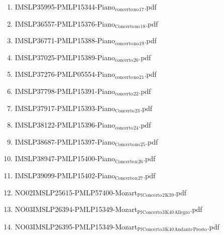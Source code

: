 \documentclass[11pt]{article}
\begin{document}
\begin{enumerate}
\begin{enumerate}
\item IMSLP35995-PMLP15344-Piano$_{\text{concerto}}$$_{\text{no}}$$_{\text{17}}$.pdf
\label{sec-1-1-1-1-44-49-4-17}

\item IMSLP36557-PMLP15376-Piano$_{\text{Concerto}}$$_{\text{no}}$$_{\text{18}}$.pdf
\label{sec-1-1-1-1-44-49-4-18}

\item IMSLP36771-PMLP15388-Piano$_{\text{concerto}}$$_{\text{no}}$$_{\text{19}}$.pdf
\label{sec-1-1-1-1-44-49-4-19}

\item IMSLP37025-PMLP15389-Piano$_{\text{concerto}}$$_{\text{20}}$.pdf
\label{sec-1-1-1-1-44-49-4-20}

\item IMSLP37276-PMLP05554-Piano$_{\text{concerto}}$$_{\text{no}}$$_{\text{21}}$.pdf
\label{sec-1-1-1-1-44-49-4-21}

\item IMSLP37798-PMLP15391-Piano$_{\text{concerto}}$$_{\text{22}}$.pdf
\label{sec-1-1-1-1-44-49-4-22}

\item IMSLP37917-PMLP15393-Piano$_{\text{Concerto}}$$_{\text{23}}$.pdf
\label{sec-1-1-1-1-44-49-4-23}

\item IMSLP38122-PMLP15396-Piano$_{\text{concerto}}$$_{\text{24}}$.pdf
\label{sec-1-1-1-1-44-49-4-24}

\item IMSLP38687-PMLP15397-Piano$_{\text{Concerto}}$$_{\text{no}}$$_{\text{25}}$.pdf
\label{sec-1-1-1-1-44-49-4-25}

\item IMSLP38947-PMLP15400-Piano$_{\text{Concerto}}$$_{\text{n}}$$_{\text{26}}$.pdf
\label{sec-1-1-1-1-44-49-4-26}

\item IMSLP39099-PMLP15402-Piano$_{\text{Concerto}}$$_{\text{n}}$$_{\text{27}}$.pdf
\label{sec-1-1-1-1-44-49-4-27}

\item NO02IMSLP25615-PMLP57400-Mozart$_{\text{Pf}}$$_{\text{Concerto}}$$_{\text{2}}$$_{\text{K39}}$.pdf
\label{sec-1-1-1-1-44-49-4-28}

\item NO03IMSLP26394-PMLP15349-Mozart$_{\text{Pf}}$$_{\text{Concerto}}$$_{\text{3}}$$_{\text{K40}}$$_{\text{Allegro}}$.pdf
\label{sec-1-1-1-1-44-49-4-29}

\item NO03IMSLP26395-PMLP15349-Mozart$_{\text{Pf}}$$_{\text{Concerto}}$$_{\text{3}}$$_{\text{K40}}$$_{\text{Andante}}$$_{\text{Presto}}$.pdf
\label{sec-1-1-1-1-44-49-4-30}


\end{enumerate}
\end{enumerate}
\end{document}
